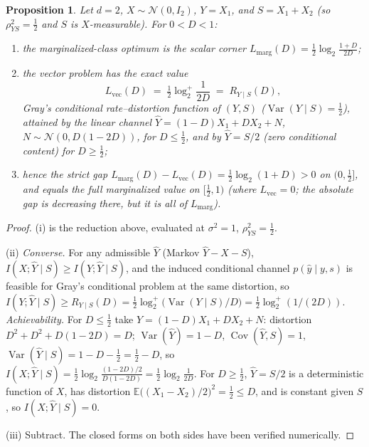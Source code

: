 \documentclass[11pt,onecolumn]{IEEEtran}
\newtheorem{proposition}[theorem]{Proposition}
\newcommand{\E}{\mathbb{E}}
\newcommand{\Cov}{\operatorname{Cov}}
\newcommand{\hY}{\widehat{Y}}
\begin{document}
\begin{proposition}\label{prop:marg}
Let $d=2$, $X\sim\mathcal N(0,I_2)$, $Y=X_1$, and $S=X_1+X_2$ (so
$\rho_{YS}^2=\tfrac12$ and $S$ is $X$-measurable). For $0<D<1$:
\begin{enumerate}
\item[(i)] the marginalized-class optimum is the scalar corner
$L_{\mathrm{marg}}(D)=\tfrac12\log_2\!\frac{1+D}{2D}$;
\item[(ii)] the vector problem has the exact value
\[
L_{\mathrm{vec}}(D)\;=\;\tfrac12\log_2^{+}\!\frac{1}{2D}
\;=\;R_{Y\mid S}(D),
\]
Gray's conditional rate--distortion function of $(Y,S)$ \cite{gray1973}
($\operatorname{Var}(Y\mid S)=\tfrac12$), attained by the linear channel
$\hY=(1-D)X_1+DX_2+N$, $N\sim\mathcal N(0,D(1-2D))$, for $D\le\tfrac12$,
and by $\hY=S/2$ (zero conditional content) for $D\ge\tfrac12$;
\item[(iii)] hence the strict gap
$L_{\mathrm{marg}}(D)-L_{\mathrm{vec}}(D)=\tfrac12\log_2(1+D)>0$ on
$(0,\tfrac12]$, and equals the full marginalized value on
$[\tfrac12,1)$ (where $L_{\mathrm{vec}}=0$; the absolute gap is decreasing
there, but it is all of $L_{\mathrm{marg}}$).
\end{enumerate}
\end{proposition}

\begin{proof}
(i) is the reduction above, evaluated at $\sigma^2=1$,
$\rho_{YS}^2=\tfrac12$.

(ii) \emph{Converse.} For any admissible $\hY$ (Markov $\hY-X-S$),
$I(X;\hY\mid S)\ge I(Y;\hY\mid S)$, and the induced conditional channel
$p(\hat y\mid y,s)$ is feasible for Gray's conditional problem at the same
distortion, so $I(Y;\hY\mid S)\ge R_{Y\mid S}(D)=\tfrac12\log_2^{+}
\bigl(\operatorname{Var}(Y\mid S)/D\bigr)=\tfrac12\log_2^{+}(1/(2D))$.
\emph{Achievability.} For $D\le\tfrac12$ take
$\hY=(1-D)X_1+DX_2+N$: distortion $D^2+D^2+D(1-2D)=D$;
$\operatorname{Var}(\hY)=1-D$, $\Cov(\hY,S)=1$,
$\operatorname{Var}(\hY\mid S)=1-D-\tfrac12=\tfrac12-D$, so
$I(X;\hY\mid S)=\tfrac12\log_2\frac{(1-2D)/2}{D(1-2D)}
=\tfrac12\log_2\frac1{2D}$. For $D\ge\tfrac12$, $\hY=S/2$ is a
deterministic function of $X$, has distortion
$\E\bigl((X_1-X_2)/2\bigr)^2=\tfrac12\le D$, and is constant given $S$, so
$I(X;\hY\mid S)=0$.

(iii) Subtract. The closed forms on both sides have been verified
numerically.
\end{proof}
\end{document}
